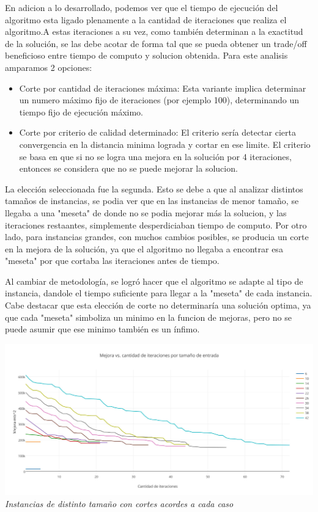En adicion a lo desarrollado, podemos ver que el tiempo de ejecución del algoritmo esta ligado plenamente a la cantidad de iteraciones que realiza el algoritmo.A estas iteraciones a su vez, como también determinan a la exactitud de la solución, se las debe acotar de forma tal que se pueda obtener un trade/off beneficioso entre tiempo de computo y solucion obtenida. Para este analisis amparamos 2 opciones:
\begin{itemize}
\item Corte por cantidad de iteraciones máxima: Esta variante implica determinar un numero máximo fijo de iteraciones (por ejemplo 100), determinando un tiempo fijo de ejecución máximo.
\item Corte por criterio de calidad determinado: El criterio sería detectar cierta convergencia en la distancia minima lograda y cortar en ese limite. El criterio se basa en que si no se logra una mejora en la solución por 4 iteraciones, entonces se considera que no se puede mejorar la solucion.
\end{itemize}

La elección seleccionada fue la segunda. Esto se debe a que al analizar distintos tamaños de instancias, se podia ver que en las instancias de menor tamaño, se llegaba a una "meseta" de donde no se podia mejorar más la solucion, y las iteraciones restaantes, simplemente desperdiciaban tiempo de computo. Por otro lado, para instancias grandes, con muchos cambios posibles, se producia un corte en la mejora de la solución, ya que el algoritmo no llegaba a encontrar esa "meseta" por que cortaba las iteraciones antes de tiempo. 

Al cambiar de metodología, se logró hacer que el algoritmo se adapte al tipo de instancia, dandole el tiempo suficiente para llegar a la "meseta" de cada instancia. Cabe destacar que esta elección de corte no determinaría una solución optima, ya que cada "meseta" simboliza un minimo en la funcion de mejoras, pero no se puede asumir que ese minimo también es un ínfimo.


  \begin{center}
 \includegraphics[scale=0.5]{./EJ4/mejora2.png}\\
 {            \textit{Instancias de distinto tamaño con cortes acordes a cada caso}}
  \end{center}
  \vspace*{0.3cm}
  


